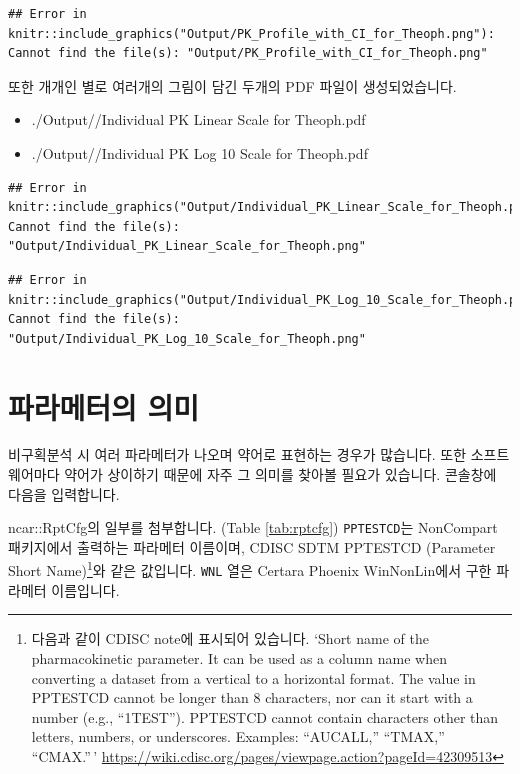 \documentclass[
  11pt,
  krantz2, a4paper, twoside]{krantz}
\providecommand{\tightlist}{%
  \setlength{\itemsep}{0pt}\setlength{\parskip}{0pt}}
\begin{document}
\begin{verbatim}
## Error in knitr::include_graphics("Output/PK_Profile_with_CI_for_Theoph.png"): Cannot find the file(s): "Output/PK_Profile_with_CI_for_Theoph.png"
\end{verbatim}

또한 개개인 별로 여러개의 그림이 담긴 두개의 PDF 파일이 생성되었습니다.

\begin{itemize}
\tightlist
\item
  ./Output//Individual PK Linear Scale for Theoph.pdf
\item
  ./Output//Individual PK Log 10 Scale for Theoph.pdf
\end{itemize}

\begin{verbatim}
## Error in knitr::include_graphics("Output/Individual_PK_Linear_Scale_for_Theoph.png"): Cannot find the file(s): "Output/Individual_PK_Linear_Scale_for_Theoph.png"
\end{verbatim}

\begin{verbatim}
## Error in knitr::include_graphics("Output/Individual_PK_Log_10_Scale_for_Theoph.png"): Cannot find the file(s): "Output/Individual_PK_Log_10_Scale_for_Theoph.png"
\end{verbatim}

\hypertarget{parameters}{%
\section{파라메터의 의미}\label{parameters}}

비구획분석 시 여러 파라메터가 나오며 약어로 표현하는 경우가 많습니다. 또한 소프트웨어마다 약어가 상이하기 때문에 자주 그 의미를 찾아볼 필요가 있습니다. 콘솔창에 다음을 입력합니다.

ncar::RptCfg의 일부를 첨부합니다. (Table \ref{tab:rptcfg}) \texttt{PPTESTCD}는 NonCompart 패키지에서 출력하는 파라메터 이름이며, CDISC SDTM PPTESTCD (Parameter Short Name)\footnote{다음과 같이 CDISC note에 표시되어 있습니다. `Short name of the pharmacokinetic parameter. It can be used as a column name when converting a dataset from a vertical to a horizontal format. The value in PPTESTCD cannot be longer than 8 characters, nor can it start with a number (e.g., ``1TEST''). PPTESTCD cannot contain characters other than letters, numbers, or underscores. Examples: ``AUCALL,'' ``TMAX,'' ``CMAX.''\,' \url{https://wiki.cdisc.org/pages/viewpage.action?pageId=42309513}}와 같은 값입니다. \texttt{WNL} 열은 Certara Phoenix WinNonLin에서 구한 파라메터 이름입니다.
\end{document}
